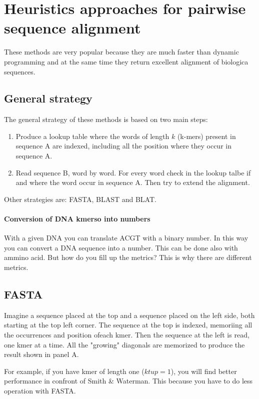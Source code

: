 \section{Heuristics approaches for pairwise sequence alignment}
These methods are very popular because they are much faster than dynamic
programming and at the same time they return excellent alignment of biologica
sequences.

\subsection{General strategy}

The general strategy of these methods is based on two main steps:
\begin{enumerate}
  \item Produce a lookup table where the words of length $k$ (k-mers) present
in sequence A are indexed, including all the position where they occur in
sequence A.
  \item Read sequence B, word by word. For every word check in the lookup talbe
if and where the word occur in sequence A. Then try to extend the alignment.
\end{enumerate}

Other strategies are: FASTA, BLAST and BLAT.

\paragraph*{Conversion of DNA kmerso into numbers}

With a given DNA you can translate ACGT with a binary number. In this way you
can convert a DNA sequence into a number. This can be done also with ammino
acid.
But how do you fill up the metrics? This is why there are different metrics.

\subsection{FASTA}

Imagine a sequence placed at the top and a sequence placed on the left side,
both starting at the top left corner. The sequence at the top is indexed,
memoriing all the occurrences and position ofeach kmer. Then the sequence at
the left is read, one kmer at a time. All the "growing" diagonals are memorized
to produce the result shown in panel A.

For example, if you have kmer of length one ($ktup = 1$), you will find better
performance in confront of Smith \& Waterman. This because you have to do less
operation with FASTA.

